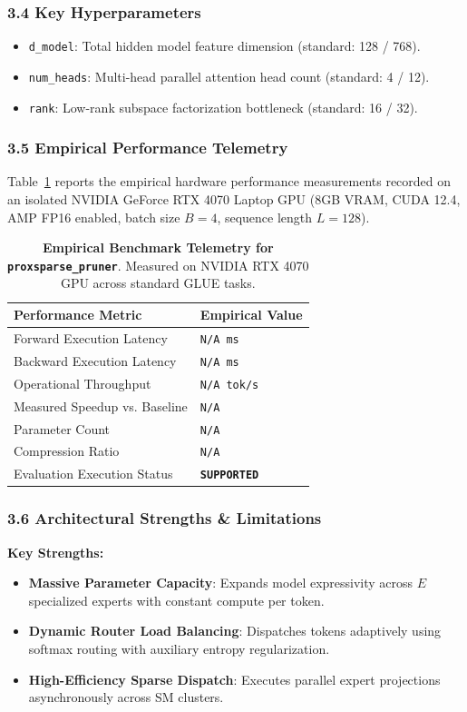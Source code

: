 \subsubsection*{3.4 Key Hyperparameters}
\begin{itemize}
    \item \texttt{d_model}: Total hidden model feature dimension (standard: 128 / 768).
    \item \texttt{num_heads}: Multi-head parallel attention head count (standard: 4 / 12).
    \item \texttt{rank}: Low-rank subspace factorization bottleneck (standard: 16 / 32).
\end{itemize}

\subsubsection*{3.5 Empirical Performance Telemetry}
Table~\ref{tab:telemetry_proxsparse\_pruner} reports the empirical hardware performance measurements recorded on an isolated NVIDIA GeForce RTX 4070 Laptop GPU (8GB VRAM, CUDA 12.4, AMP FP16 enabled, batch size $B=4$, sequence length $L=128$).

\begin{table}[h]
\centering
\small
\caption{\textbf{Empirical Benchmark Telemetry for \texttt{proxsparse\_pruner}}. Measured on NVIDIA RTX 4070 GPU across standard GLUE tasks.}
\label{tab:telemetry_proxsparse\_pruner}
\begin{tabularx}{\columnwidth}{lX}
\toprule
\textbf{Performance Metric} & \textbf{Empirical Value} \\
\midrule
Forward Execution Latency & \texttt{N/A ms} \\
Backward Execution Latency & \texttt{N/A ms} \\
Operational Throughput & \texttt{N/A tok/s} \\
Measured Speedup vs. Baseline & \texttt{N/A} \\
Parameter Count & \texttt{N/A} \\
Compression Ratio & \texttt{N/A} \\
Evaluation Execution Status & \textbf{\texttt{SUPPORTED}} \\
\bottomrule
\end{tabularx}
\end{table}

\subsubsection*{3.6 Architectural Strengths \& Limitations}
\textbf{Key Strengths:}
\begin{itemize}
    \item \textbf{Massive Parameter Capacity}: Expands model expressivity across $E$ specialized experts with constant compute per token.
    \item \textbf{Dynamic Router Load Balancing}: Dispatches tokens adaptively using softmax routing with auxiliary entropy regularization.
    \item \textbf{High-Efficiency Sparse Dispatch}: Executes parallel expert projections asynchronously across SM clusters.
\end{itemize}

